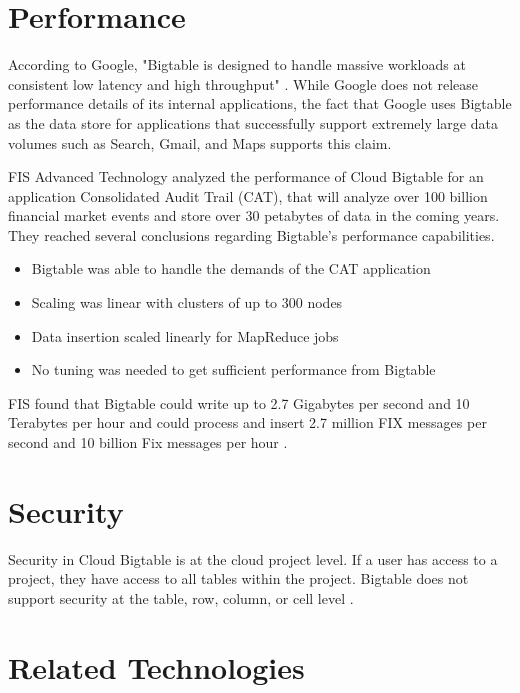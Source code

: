 \documentclass[9pt,twocolumn,twoside]{../../styles/osajnl}
\begin{document}
\section{Performance}

According to Google, "Bigtable is designed to handle massive workloads at consistent low latency and high throughput" \cite{www-cloudbigtable}.  While Google does not release performance details of its internal applications, the fact that Google uses Bigtable as the data store for applications that successfully support extremely large data volumes such as Search, Gmail, and Maps supports this claim.

FIS Advanced Technology analyzed the performance of Cloud Bigtable for an application Consolidated Audit Trail (CAT), that will analyze over 100 billion financial market events and store over 30 petabytes of data in the coming years.  They reached several conclusions regarding Bigtable's performance capabilities.
\begin{itemize}
\item Bigtable was able to handle the demands of the CAT application 
\item Scaling was linear with clusters of up to 300 nodes 
\item Data insertion scaled linearly for MapReduce jobs 
\item No tuning was needed to get sufficient performance from Bigtable
\end{itemize}

FIS found that Bigtable could write up to 2.7 Gigabytes per second and 10 Terabytes per hour and could process and insert 2.7 million FIX messages per second and 10 billion Fix messages per hour \cite{www-fis}.

\section{Security}

Security in Cloud Bigtable is at the cloud project level. If a user has access to a project, they have access to all tables within the project. Bigtable does not support security at the table, row, column, or cell level \cite{www-bigtabledocoverview}.

\section{Related Technologies}
\end{document}

